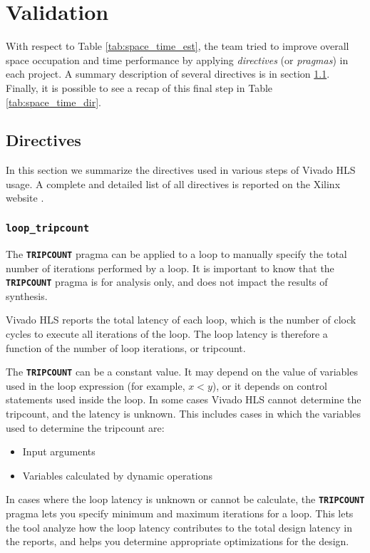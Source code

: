 \chapter{Validation}
\label{chapter:validation}
With respect to Table \ref{tab:space_time_est}, the team tried to improve overall space occupation and time performance by applying \emph{directives} (or \emph{pragmas}) in each project. A summary description of several directives is in section \ref{sec:directives}. Finally, it is possible to see a recap of this final step in Table \ref{tab:space_time_dir}.

\section{Directives}
\label{sec:directives}

In this section we summarize the directives used in various steps of Vivado HLS usage. A complete and detailed list of all directives is reported on the Xilinx website \cite{xilinx_directives}.

\subsection{\texttt{loop\_tripcount}}

The \texttt{\textbf{TRIPCOUNT}} pragma can be applied to a loop to manually specify the total number of iterations performed by a loop. It is important to know that the \texttt{\textbf{TRIPCOUNT}} pragma is for analysis only, and does not impact the results of synthesis.

Vivado HLS reports the total latency of each loop, which is the number of clock cycles to execute all iterations of the loop. The loop latency is therefore a function of the number of loop iterations, or tripcount.

The \texttt{\textbf{TRIPCOUNT}} can be a constant value. It may depend on the value of variables used in the loop expression (for example, $x<y$), or it depends on control statements used inside the loop. In some cases Vivado HLS cannot determine the tripcount, and the latency is unknown. This includes cases in which the variables used to determine the tripcount are:
\begin{itemize} [noitemsep]
	\item Input arguments
	\item Variables calculated by dynamic operations
\end{itemize}

In cases where the loop latency is unknown or cannot be calculate, the \texttt{\textbf{TRIPCOUNT}} pragma lets you specify minimum and maximum iterations for a loop. This lets the tool analyze how the loop latency contributes to the total design latency in the reports, and helps you determine appropriate optimizations for the design.

